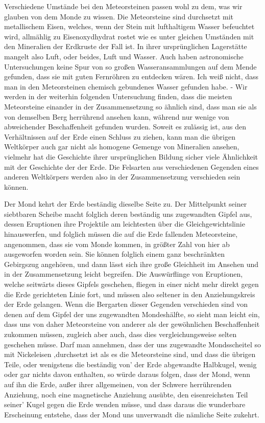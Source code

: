 \documentclass[a4paper, 11pt, oneside]{article}
\begin{document}
Verschiedene Umstände bei den Meteorsteinen passen wohl zu dem, was wir glauben von dem Monde zu wissen. Die Meteorsteine sind durchsetzt mit metallischem Eisen, welches, wenn der Stein mit lufthaltigem Wasser befeuchtet wird, allmählig zu Eisenoxydhydrat rostet wie es unter gleichen Umständen mit den Mineralien der Erdkruste der Fall ist. In ihrer ursprünglichen Lagerstätte mangelt also Luft, oder beides, Luft und Wasser. Auch haben astronomische Untersuchungen keine Spur von so großen Wasseransammlungen auf dem Mende gefunden, dass sie mit guten Fernröhren zu entdecken wären. Ich weiß nicht, dass man in den Meteorsteinen chemisch gebundenes Wasser gefunden habe. - Wir werden in der weiterhin folgenden Untersuchung finden, dass die meisten Meteorsteine einander in der Zusammensetzung so ähnlich sind, dass man sie als von demselben Berg herrührend ansehen kann, während nur wenige von abweichender Beschaffenheit gefunden wurden. Soweit es zulässig ist, aus den Verhältnissen auf der Erde einen Schluss zu ziehen, kann man die übrigen Weltkörper auch gar nicht als homogene Gemenge von Mineralien ansehen, vielmehr hat die Geschichte ihrer ursprünglichen Bildung sicher viele Ähnlichkeit mit der Geschichte der der Erde. Die Felsarten aus verschiedenen Gegenden eines anderen Weltkörpers werden also in der Zusammensetzung verschieden sein können.

Der Mond kehrt der Erde beständig dieselbe Seite zu. Der Mittelpunkt seiner siebtbaren Scheibe macht folglich deren beständig uns zugewandten Gipfel aus, dessen Eruptionen ihre Projektile am leichtesten über die Gleichgewichtslinie hinauswerfen, und folglich müssen die auf die Erde fallenden Meteorsteine, angenommen, dass sie vom Monde kommen, in größter Zahl von hier ab ausgeworfen worden sein. Sie können folglich einem ganz beschränkten Gebirgszug angehören, und dann lässt sich ihre große Gleichheit im Ansehen und in der Zusammensetzung leicht begreifen. Die Auswürflinge von Eruptionen, welche seitwärts dieses Gipfels geschehen, fliegen in einer nicht mehr direkt gegen die Erde gerichteten Linie fort, und müssen also seltener in den Anziehungskreis der Erde gelangen. Wenn die Bergarten dieser Gegenden verschieden sind von denen auf dem Gipfel der uns zugewandten Mondeshälfte, so sieht man leicht ein, dass uns von daher Meteorsteine von anderer als der gewöhnlichen Beschaffenheit zukommen müssen, zugleich aber auch, dass dies vergleichungsweise selten geschehen müsse. Darf man annehmen, dass der uns zugewandte Mondsscheitel so mit Nickeleisen ‚durchsetzt ist als es die Meteorsteine sind, und dass die übrigen Teile, oder wenigstens die beständig von’ der Erde abgewandte Halbkugel, wenig oder gar nichts davon enthalten, so würde daraus folgen, dass der Mond, wenn auf ihn die Erde, außer ihrer allgemeinen, von der Schwere herrührenden Anziehung, noch eine magnetische Anziehung ausübte, den eisenreichsten Teil seiner’ Kugel gegen die Erde wenden müsse, und dass daraus die wunderbare Erscheinung entstehe, dass der Mond uns unverwandt die nämliche Seite zukehrt.
\end{document}
